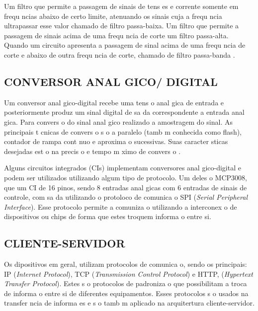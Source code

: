 \documentclass{article}
\begin{document}
Um filtro que permite a passagem de sinais de tens es e corrente somente em frequ ncias abaixo de certo limite, atenuando os sinais cuja a frequ ncia ultrapassar esse valor   chamado de filtro passa-baixa. Um filtro que permite a passagem de sinais acima de uma frequ ncia de corte   um filtro passa-alta. Quando um circuito apresenta a passagem de sinal acima de uma frequ ncia de corte e abaixo de outra frequ ncia de corte,   chamado de filtro passa-banda \cite{boy}.

\subsection{CONVERSOR ANAL GICO/ DIGITAL}

\hspace*{0.8cm}Um conversor anal gico-digital recebe uma tens o anal gica de entrada e posteriormente produz um sinal digital de sa da correspondente a entrada anal gica. Para convers o do sinal anal gico   realizado a amostragem do sinal. As principais t cnicas de convers o s o a paralelo (tamb m conhecida como flash), contador de rampa cont nuo e aproxima o sucessivas. Suas caracter sticas desejadas est o na precis o e tempo m ximo de convers o \cite{digi}.

Alguns circuitos integrados (CIs) implementam conversores anal gico-digital e podem ser utilizados utilizando algum tipo de protocolo. Um deles   o MCP3008, que   um CI de 16 pinos, sendo 8 entradas anal gicas com 6 entradas de sinais de controle, com sa da utilizando o protoloco  de comunica o SPI (\textit{Serial Peripheral Interface}). Esse protocolo permite a comuniza o utilizando a interconex o de dispositivos ou chips de forma que estes troquem informa o entre si.


\subsection{CLIENTE-SERVIDOR}

\hspace*{0.8cm}Os dipositivos em geral, utilizam protocolos de comunica o, sendo os principais: IP (\textit {Internet Protocol}), TCP (\textit {Transmission Control Protocol}) e HTTP, (\textit{Hypertext Transfer Protocol}). Estes s o protocolos de padroniza o que possibilitam a troca de informa o entre si de diferentes equipamentos. Esses protocolos s o usados na transfer ncia de informa es e s o tamb m aplicado na arquitertura cliente-servidor.
\end{document}
